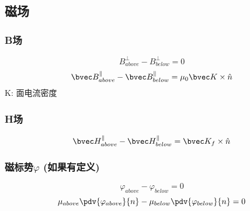 \subsection{磁场}

\subsubsection{B场}
\begin{equation}
B^\perp_{above} - B^\perp_{below} = 0
\end{equation}
\begin{equation}
\bvec B^\parallel_{above} - \bvec B^\parallel_{below} = \mu_0\bvec K \times \hat n 
\end{equation}
K: 面电流密度
\subsubsection{H场}
\begin{equation}
\bvec H^\parallel_{above} - \bvec H^\parallel_{below} = \bvec K_f \times \hat n 
\end{equation}
\subsubsection{磁标势$\varphi$ (如果有定义)}
\begin{equation}
\varphi_{above}-\varphi_{below}=0
\end{equation}
\begin{equation}
\mu_{above}\pdv{\varphi_{above}}{n} - \mu_{below}\pdv{\varphi_{below}}{n}  = 0
\end{equation}
